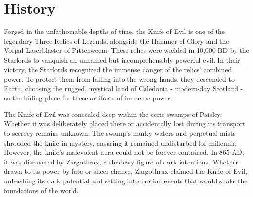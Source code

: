 \section*{History}
{\entryfont Forged in the unfathomable depths of time, the Knife of Evil is one of the legendary Three Relics of Legends, alongside the Hammer of Glory and the Vorpal Laserblaster of Pittenweem. These relics were wielded in 10,000 BD by the Starlords to vanquish an unnamed but incomprehensibly powerful evil. In their victory, the Starlords recognized the immense danger of the relics' combined power. To protect them from falling into the wrong hands, they descended to Earth, choosing the rugged, mystical land of Caledonia - modern-day Scotland - as the hiding place for these artifacts of immense power.

The Knife of Evil was concealed deep within the eerie swamps of Paisley. Whether it was deliberately placed there or accidentally lost during its transport to secrecy remains unknown. The swamp's murky waters and perpetual mists shrouded the knife in mystery, ensuring it remained undisturbed for millennia. However, the knife's malevolent aura could not be forever contained. In 865 AD, it was discovered by Zargothrax, a shadowy figure of dark intentions. Whether drawn to its power by fate or sheer chance, Zargothrax claimed the Knife of Evil, unleashing its dark potential and setting into motion events that would shake the foundations of the world.}

